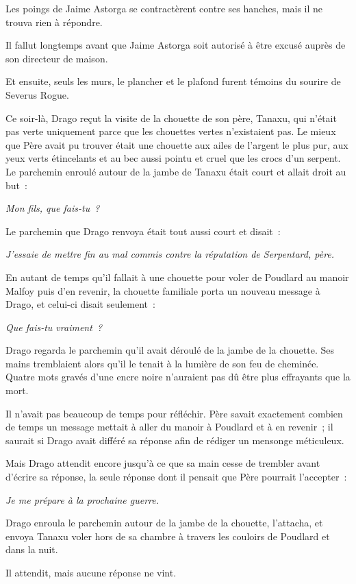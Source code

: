 Les poings de Jaime Astorga se contractèrent contre ses hanches, mais il ne trouva rien à répondre.

Il fallut longtemps avant que Jaime Astorga soit autorisé à être excusé auprès de son directeur de maison.

Et ensuite, seuls les murs, le plancher et le plafond furent témoins du sourire de Severus Rogue.

\later

Ce soir-là, Drago reçut la visite de la chouette de son père, Tanaxu, qui n'était pas verte uniquement parce que les chouettes vertes n'existaient pas.
Le mieux que Père avait pu trouver était une chouette aux ailes de l'argent le plus pur, aux yeux verts étincelants et au bec aussi pointu et cruel que les crocs d'un serpent.
Le parchemin enroulé autour de la jambe de Tanaxu était court et allait droit au but~:

\emph{Mon fils, que fais-tu~?}

Le parchemin que Drago renvoya était tout aussi court et disait~:

\emph{J'essaie de mettre fin au mal commis contre la réputation de Serpentard, père.}

En autant de temps qu'il fallait à une chouette pour voler de Poudlard au manoir Malfoy puis d'en revenir, la chouette familiale porta un nouveau message à Drago, et celui-ci disait seulement~:

\emph{Que fais-tu vraiment~?}

Drago regarda le parchemin qu'il avait déroulé de la jambe de la chouette.
Ses mains tremblaient alors qu'il le tenait à la lumière de son feu de cheminée.
Quatre mots gravés d'une encre noire n'auraient pas dû être plus effrayants que la mort.

Il n'avait pas beaucoup de temps pour réfléchir.
Père savait exactement combien de temps un message mettait à aller du manoir à Poudlard et à en revenir~; il saurait si Drago avait différé sa réponse afin de rédiger un mensonge méticuleux.

Mais Drago attendit encore jusqu'à ce que sa main cesse de trembler avant d'écrire sa réponse, la seule réponse dont il pensait que Père pourrait l'accepter~:

\emph{Je me prépare à la prochaine guerre.}

Drago enroula le parchemin autour de la jambe de la chouette, l'attacha, et envoya Tanaxu voler hors de sa chambre à travers les couloirs de Poudlard et dans la nuit.

Il attendit, mais aucune réponse ne vint.

